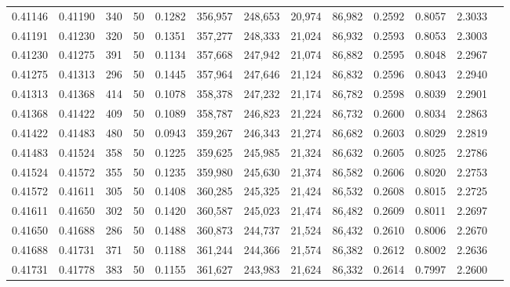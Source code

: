 \begin{tabular}{rrrrrrrrrrrrr}
0.41146 & 0.41190 &   340 &  50 &                                     0.1282 & 356,957 & 248,653 &  20,974 &  86,982 & 0.2592 & 0.8057 & 2.3033 \\
0.41191 & 0.41230 &   320 &  50 &                                     0.1351 & 357,277 & 248,333 &  21,024 &  86,932 & 0.2593 & 0.8053 & 2.3003 \\
0.41230 & 0.41275 &   391 &  50 &                                     0.1134 & 357,668 & 247,942 &  21,074 &  86,882 & 0.2595 & 0.8048 & 2.2967 \\
0.41275 & 0.41313 &   296 &  50 &                                     0.1445 & 357,964 & 247,646 &  21,124 &  86,832 & 0.2596 & 0.8043 & 2.2940 \\
0.41313 & 0.41368 &   414 &  50 &                                     0.1078 & 358,378 & 247,232 &  21,174 &  86,782 & 0.2598 & 0.8039 & 2.2901 \\
0.41368 & 0.41422 &   409 &  50 &                                     0.1089 & 358,787 & 246,823 &  21,224 &  86,732 & 0.2600 & 0.8034 & 2.2863 \\
0.41422 & 0.41483 &   480 &  50 &                                     0.0943 & 359,267 & 246,343 &  21,274 &  86,682 & 0.2603 & 0.8029 & 2.2819 \\
0.41483 & 0.41524 &   358 &  50 &                                     0.1225 & 359,625 & 245,985 &  21,324 &  86,632 & 0.2605 & 0.8025 & 2.2786 \\
0.41524 & 0.41572 &   355 &  50 &                                     0.1235 & 359,980 & 245,630 &  21,374 &  86,582 & 0.2606 & 0.8020 & 2.2753 \\
0.41572 & 0.41611 &   305 &  50 &                                     0.1408 & 360,285 & 245,325 &  21,424 &  86,532 & 0.2608 & 0.8015 & 2.2725 \\
0.41611 & 0.41650 &   302 &  50 &                                     0.1420 & 360,587 & 245,023 &  21,474 &  86,482 & 0.2609 & 0.8011 & 2.2697 \\
0.41650 & 0.41688 &   286 &  50 &                                     0.1488 & 360,873 & 244,737 &  21,524 &  86,432 & 0.2610 & 0.8006 & 2.2670 \\
0.41688 & 0.41731 &   371 &  50 &                                     0.1188 & 361,244 & 244,366 &  21,574 &  86,382 & 0.2612 & 0.8002 & 2.2636 \\
0.41731 & 0.41778 &   383 &  50 &                                     0.1155 & 361,627 & 243,983 &  21,624 &  86,332 & 0.2614 & 0.7997 & 2.2600 \\

\end{tabular}

